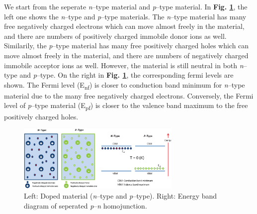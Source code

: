 \documentclass[a4paper, 12pt, titlepage,oneside,drop]{kthesis}
\begin{document}
We start from the seperate \textit{n}--type material and \textit{p}--type material. In \textbf{Fig. \ref{dopedmaterials}}, the left one shows the \textit{n}--type and \textit{p}--type materials. The \textit{n}--type material 
has many free negatively charged electrons which can move almost freely in the material, and there are numbers of positively charged immobile donor ions as well. Similarily, the \textit{p}--type material has many free positively
charged holes which can move almost freely in the material, and there are numbers of negatively charged immobile acceptor ions as well. However, the material is still neutral in both \textit{n}--type and \textit{p}--type.
On the right in \textbf{Fig. \ref{dopedmaterials}}, the corresponding fermi levels are shown. The Fermi level (E\textsubscript{nf}) is closer to conduction band minimum for \textit{n}--type material due to the many free 
negatively charged electrons. Conversely, the Fermi level of \textit{p}--type material (E\textsubscript{pf}) is closer to the valence band maximum to the free positively charged holes.



\begin{figure}[H]
    \begin{center}
            \includegraphics[width=0.7\textwidth,clip]{sepratepn.eps}
     \end{center}
    \caption{Left: Doped material (\textit{n}--type and \textit{p}--type). Right: Energy band diagram of seperated \textit{p}--\textit{n} homojunction.}      
    \label{dopedmaterials}
\end{figure}
\end{document}

